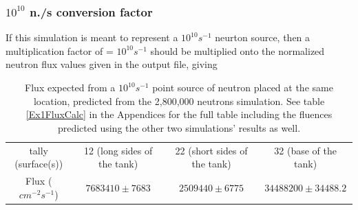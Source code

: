 \documentclass[a4paper, 11pt]{article}
\begin{document}
\subsubsection{$10^{10}$ n./s conversion factor}
	If this simulation is meant to represent a $10^{10} s^{-1}$ neurton source, then a multiplication factor of = $ 10^{10} s^{-1}$ should be multiplied onto the normalized neutron flux values given in the output file, giving
\begin{table}[H]
	\centering
	\begin{tabular}{cccc}
		tally (surface(s)) & 12 (long sides of the tank) & 22 (short sides of the tank) & 32 (base of the tank)	\\
		Flux (${cm}^{-2}s^{-1}$) & $7683410\pm7683$& $2509440\pm6775$ & $34488200\pm34488.2$
	\end{tabular}
	\caption{Flux expected from a $10^{10} s^{-1}$ point source of neutron placed at the same location, predicted from the 2,800,000 neutrons simulation. See table \ref{Ex1FluxCalc} in the Appendices for the full table including the fluences predicted using the other two simulations' results as well.
	}\label{Ex1FluxCalc_small}
\end{table}
\end{document}
